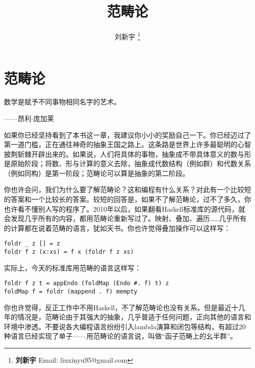 \documentclass{article}
\begin{document}
\title{范畴论}

\author{刘新宇
\thanks{{\bfseries 刘新宇} \newline
  Email: liuxinyu95@gmail.com \newline}
  }

\maketitle
\fi


\ifx\wholebook\relax
\chapter{范畴论}
\fi

\epigraph{数学是赋予不同事物相同名字的艺术。}{——昂利$\cdot$庞加莱}


如果你已经坚持看到了本书这一章，我建议你小小的奖励自己一下。你已经迈过了第一道门槛，正在通往神奇的抽象王国之路上。这条路是世界上许多最聪明的心智披荆斩棘开辟出来的。如果说，人们将具体的事物，抽象成不带具体意义的数与形是原始阶段；将数、形与计算的意义去除，抽象成代数结构（例如群）和代数关系（例如同构）是第一阶段；范畴论可以算是抽象的第二阶段。

你也许会问，我们为什么要了解范畴论？这和编程有什么关系？对此有一个比较短的答案和一个比较长的答案。较短的回答是，如果不了解范畴论，过不了多久，你也许看不懂别人写的程序了。2010年以后，如果翻看Haskell标准库的源代码，就会发现几乎所有的内容，都用范畴论重新写过了。映射、叠加、遍历……几乎所有的计算都在说着范畴的语言，犹如天书。你也许觉得叠加操作可以这样写：

\lstset{language=Haskell, frame=single}
 \begin{lstlisting}
foldr _ z [] = z
foldr f z (x:xs) = f x (foldr f z xs)
\end{lstlisting}

实际上，今天的标准库用范畴的语言这样写：

\begin{lstlisting}
foldr f z t = appEndo (foldMap (Endo #. f) t) z
foldMap f = foldr (mappend . f) mempty
\end{lstlisting}

你也许觉得，反正工作中不用Haskell，不了解范畴论也没有关系。但是最近十几年的情况是，范畴论由于其强大的抽象，几乎普适于任何问题，正向其他的语言和环境中渗透。不要说各大编程语言纷纷引入lambda演算和闭包等结构，有超过20种语言已经实现了单子\cite{Monad-Haskell-Wiki}——用范畴论的语言说，叫做“函子范畴上的幺半群”。
\end{document}
